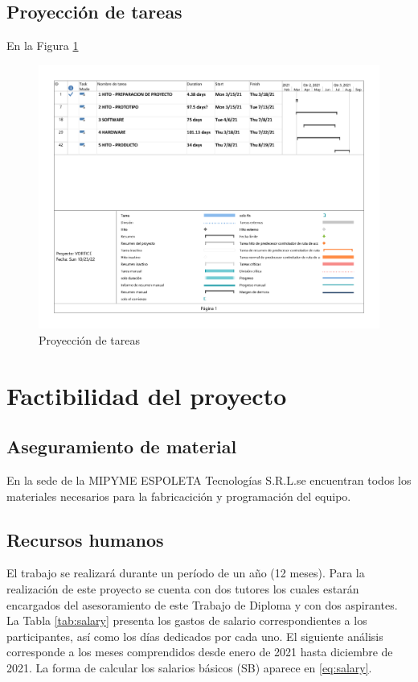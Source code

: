 \documentclass[conference, a4paper]{IEEEtran}
\newcommand{\espoleta}{ESPOLETA Tecnologías S.R.L.}
\begin{document}
\subsection{Proyección de tareas}\label{subsec:proyeccion-de-tareas}
En la Figura \ref{fig:gantt}

\begin{figure}[htpb]
	\includegraphics[width=\linewidth]{../shared/figure/gantt} \caption{Proyección de tareas} \label{fig:gantt}
\end{figure}

\section{Factibilidad del proyecto}\label{sec:factibilidad-del-proyecto}

\subsection{Aseguramiento de material}\label{subsec:aseguramiento-de-material} En la sede de la MIPYME \espoleta se encuentran todos los materiales necesarios
para la fabricacición y programación del equipo.

\subsection{Recursos humanos}\label{subsec:recursos-humanos}
El trabajo se realizará durante un período de un año (12 meses).
Para la realización de este proyecto se cuenta con dos tutores los cuales
estarán encargados del asesoramiento de este Trabajo de Diploma y con dos
aspirantes.
La Tabla \ref{tab:salary} presenta los gastos de salario correspondientes a los
participantes, así como los días dedicados por cada uno.
El siguiente análisis corresponde a los meses comprendidos desde enero de 2021
hasta diciembre de 2021.
La forma de calcular los salarios básicos (SB) aparece en \ref{eq:salary}.
\end{document}
